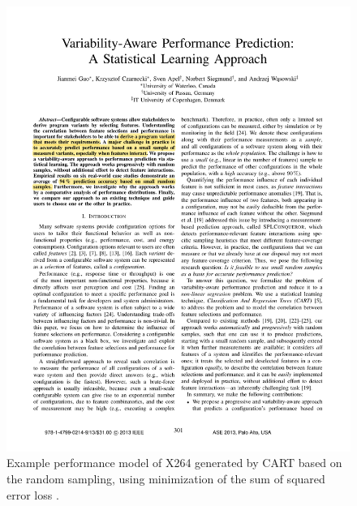 \begin{figure}
	\centering
	\includegraphics[page=4,clip,trim=3.5cm 18cm 3.5cm 1.5cm, width=\linewidth]
	{Paper/VariabilityAwarePerformancePredictionAStatisticalLearningApproach.pdf}
	\caption{Example performance model of X264 generated by CART based on the random sampling, using minimization of the sum of squared error loss \cite{VariabilityAwarePerformancePredictionJianmeiSigmundApel}.}	
	\label{fig:VAPPExampleTree}	
\end{figure}

